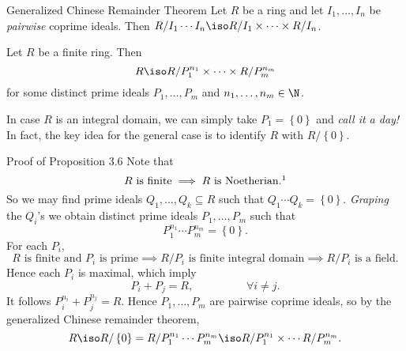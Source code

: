 \documentclass[pmath441]{subfiles}
\begin{document}
    \clearpage
    
    \begin{theorem}{Generalized Chinese Remainder Theorem}
        Let $R$ be a ring and let $I_1,\ldots,I_n$ be \textit{pairwise} coprime ideals. Then $R /I_1\cdots I_n \iso R /I_1 \times \cdots \times R /I_n$.
    \end{theorem}

    \rruleline

    \begin{prop}{}
        Let $R$ be a finite ring. Then 
        \begin{equation*}
            R \iso R /P_1^{n_1} \times \cdots \times R /P_m^{n_m}
        \end{equation*}
        for some distinct prime ideals $P_1,\ldots,P_m$ and $n_1,\ldots,n_m\in\N$.
    \end{prop}

    \rruleline

    \np In case $R$ is an integral domain, we can simply take $P_1 = \left\lbrace 0 \right\rbrace$ and \textit{call it a day!} In fact, the key idea for the general case is to identify $R$ with $R / \left\lbrace 0 \right\rbrace$.

    \begin{boxyproof}{Proof of Proposition 3.6}
        Note that
        \begin{equation*}
            R\text{ is finite} \implies R\text{ is Noetherian}.\footnotemark[1]
        \end{equation*}
        So we may find prime ideals $Q_1,\ldots,Q_k\subseteq R$ such that $Q_1\cdots Q_k=\left\lbrace 0 \right\rbrace$. \textit{Graping} the $Q_i$'s we obtain distinct prime ideals $P_1,\ldots,P_m$ such that
        \begin{equation*}
            P_1^{n_1}\cdots P_m^{n_m} = \left\lbrace 0 \right\rbrace.
        \end{equation*}
        For each $P_i$,
        \begin{equation*}
            R\text{ is finite and }P_i\text{ is prime}\implies R /P_i\text{ is finite integral domain} \implies R /P_i\text{ is a field}.
        \end{equation*}
        Hence each $P_i$ is maximal, which imply
        \begin{equation*}
            P_i+P_j = R, \hspace{2cm}\forall i\neq j.
        \end{equation*}
        It follows $P_i^{n_i}+P_j^{n_j}=R$. Hence $P_1,\ldots,P_m$ are pairwise coprime ideals, so by the generalized Chinese remainder theorem,
        \begin{equation*}
            R \iso R /\left\lbrace 0 \right\rbrace = R /P_1^{n_1}\cdots P_m^{n_m} \iso R /P_1^{n_1}\times\cdots R /P_m^{n_m}.
        \end{equation*}

        \noindent
        \begin{minipage}{\textwidth}
        \end{minipage}
    \end{boxyproof}
\end{document}
